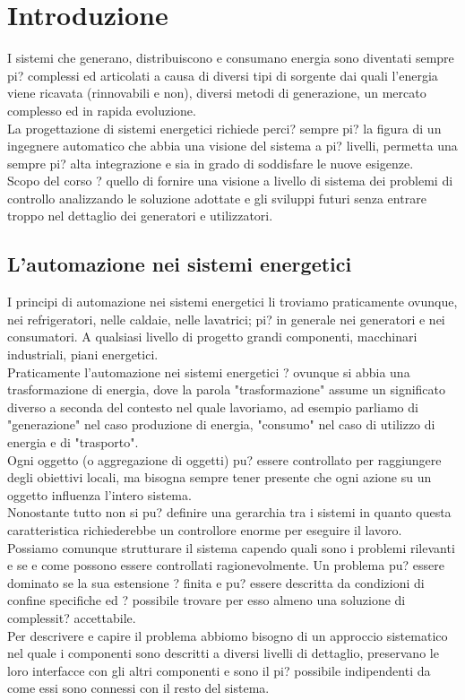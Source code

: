 \label{capitolo1}
\section{Introduzione}I sistemi che generano, distribuiscono e consumano energia sono diventati sempre pi? complessi ed articolati a causa di diversi tipi di sorgente dai quali l'energia viene ricavata (rinnovabili e non), diversi metodi di generazione, un mercato complesso ed in rapida evoluzione.\\
La progettazione di sistemi energetici richiede perci? sempre pi? la figura di un ingegnere automatico che abbia una visione del sistema a pi? livelli, permetta una sempre pi? alta integrazione e sia in grado di soddisfare le nuove esigenze.\\
Scopo del corso ? quello di fornire una visione a livello di sistema dei problemi di controllo analizzando le soluzione adottate e gli sviluppi futuri senza entrare troppo nel dettaglio dei generatori e utilizzatori.
\subsection{L'automazione nei sistemi energetici}
I principi di automazione nei sistemi energetici li troviamo praticamente ovunque, nei refrigeratori, nelle caldaie, nelle lavatrici; pi? in generale nei generatori e nei consumatori.
A qualsiasi livello di progetto grandi componenti, macchinari industriali, piani energetici.\\
Praticamente l'automazione nei sistemi energetici ? ovunque si abbia una trasformazione di energia, dove la parola "trasformazione" assume un significato diverso a seconda del contesto nel quale lavoriamo, ad esempio parliamo di "generazione" nel caso produzione di energia, "consumo" nel caso di utilizzo di energia e di "trasporto".\\
Ogni oggetto (o aggregazione di oggetti) pu? essere controllato per raggiungere degli obiettivi locali, ma bisogna sempre tener presente che ogni azione su un oggetto influenza l'intero sistema.\\
Nonostante tutto non si pu? definire una gerarchia tra i sistemi in quanto questa caratteristica richiederebbe un controllore enorme per eseguire il lavoro.\\
Possiamo comunque strutturare il sistema capendo quali sono i problemi rilevanti e se e come possono essere controllati ragionevolmente.
Un problema pu? essere dominato se la sua estensione ? finita e pu? essere descritta da condizioni di confine specifiche ed ? possibile trovare per esso almeno una soluzione di complessit? accettabile.\\
Per descrivere e capire il problema abbiomo bisogno di un approccio sistematico nel quale i componenti sono descritti a diversi livelli di dettaglio, preservano le loro interfacce con gli altri componenti e sono il pi? possibile indipendenti da come essi sono connessi con il resto del sistema.
